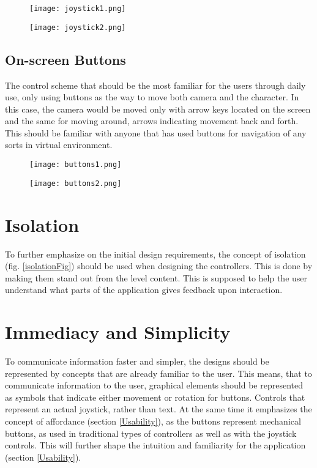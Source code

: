 \begin{figure}[H]
\centering
\begin{minipage}{.5\textwidth}
  \centering
  \texttt{[image: joystick1.png]}
\end{minipage}%
\begin{minipage}{.5\textwidth}
  \centering
  \texttt{[image: joystick2.png]}
\end{minipage}
  \label{fig:joystickSketch}

\end{figure}

\subsection{On-screen Buttons}
The control scheme that should be the most familiar for the users through daily use, only using buttons as the way to move both camera and the character. In this case, the camera would be moved only with arrow keys located on the screen and the same for moving around, arrows indicating movement back and forth. This should be familiar with anyone that has used buttons for navigation of any sorts in virtual environment. 

\begin{figure}[H]
\centering
\begin{minipage}{.5\textwidth}
  \centering
  \texttt{[image: buttons1.png]}
\end{minipage}%
\begin{minipage}{.5\textwidth}
  \centering
  \texttt{[image: buttons2.png]}
\end{minipage}
  \label{fig:buttonSketch}
\end{figure}

\section{Isolation}
To further emphasize on the initial design requirements, the concept of isolation (fig. \ref{isolationFig}) should be used when designing the controllers. This is done by making them stand out from the level content. This is supposed to help the user understand what parts of the application gives feedback upon interaction.

\section{Immediacy and Simplicity}
To communicate information faster and simpler, the designs should be represented by concepts that are already familiar to the user. This means, that to communicate information to the user, graphical elements should be represented as symbols that indicate either movement or rotation for buttons. Controls that represent an actual joystick, rather than
text. At the same time it emphasizes the concept of affordance (section \ref{Usability}), as the buttons represent mechanical buttons, as used in traditional types of controllers as well as with the joystick controls. This will further shape the intuition and familiarity for the application (section \ref{Usability}).

